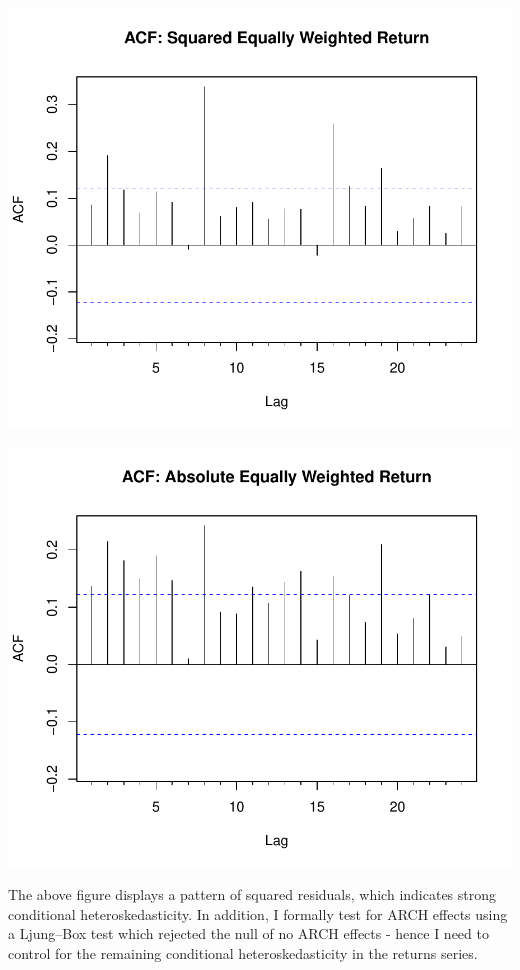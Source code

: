 \documentclass[11pt,preprint, authoryear]{elsarticle}
\numberwithin{equation}{section}
\numberwithin{figure}{section}
\numberwithin{table}{section}
\begin{document}
\includegraphics{FinMetrics-Essay_files/figure-latex/unnamed-chunk-5-1.pdf}

\includegraphics{FinMetrics-Essay_files/figure-latex/unnamed-chunk-6-1.pdf}

The above figure displays a pattern of squared residuals, which
indicates strong conditional heteroskedasticity. In addition, I formally
test for ARCH effects using a Ljung--Box test which rejected the null of
no ARCH effects - hence I need to control for the remaining conditional
heteroskedasticity in the returns series.
\end{document}
